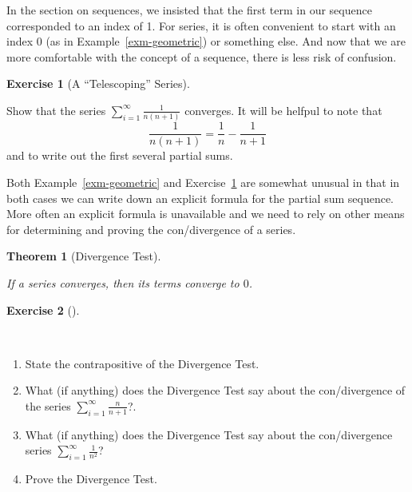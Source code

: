 \documentclass[
  letterpaper,
  DIV=11,
  numbers=noendperiod]{scrreprt}
\providecommand{\tightlist}{%
  \setlength{\itemsep}{0pt}\setlength{\parskip}{0pt}}
\theoremstyle{plain}
\newtheorem{theorem}{Theorem}[chapter]
\theoremstyle{definition}
\newtheorem{exercise}{Exercise}[chapter]
\theoremstyle{plain}
\theoremstyle{plain}
\theoremstyle{definition}
\theoremstyle{definition}
\theoremstyle{remark}
\begin{document}
\begin{tcolorbox}[enhanced jigsaw, titlerule=0mm, opacitybacktitle=0.6, leftrule=.75mm, bottomrule=.15mm, left=2mm, arc=.35mm, colback=white, rightrule=.15mm, colframe=quarto-callout-note-color-frame, toptitle=1mm, breakable, opacityback=0, colbacktitle=quarto-callout-note-color!10!white, bottomtitle=1mm, title=\textcolor{quarto-callout-note-color}{\faInfo}\hspace{0.5em}{Note}, coltitle=black, toprule=.15mm]

In the section on sequences, we insisted that the first term in our
sequence corresponded to an index of 1. For series, it is often
convenient to start with an index 0 (as in Example~\ref{exm-geometric})
or something else. And now that we are more comfortable with the concept
of a sequence, there is less risk of confusion.

\end{tcolorbox}

\begin{exercise}[A ``Telescoping''
Series]\protect\hypertarget{exr-telescoping-example}{}\label{exr-telescoping-example}

Show that the series \(\displaystyle\sum_{i=1}^\infty \frac{1}{n(n+1)}\)
converges. It will be helfpul to note that
\[\frac{1}{n(n+1)}=\frac{1}{n}-\frac{1}{n+1}\] and to write out the
first several partial sums.

\end{exercise}

Both Example~\ref{exm-geometric} and
Exercise~\ref{exr-telescoping-example} are somewhat unusual in that in
both cases we can write down an explicit formula for the partial sum
sequence. More often an explicit formula is unavailable and we need to
rely on other means for determining and proving the con/divergence of a
series.

\begin{theorem}[Divergence
Test]\protect\hypertarget{thm-divergence-test}{}\label{thm-divergence-test}

If a series converges, then its terms converge to \(0\).

\end{theorem}

\begin{exercise}[]\protect\hypertarget{exr-divergence-test-proof}{}\label{exr-divergence-test-proof}

~

\begin{enumerate}
\def\labelenumi{\arabic{enumi}.}
\tightlist
\item
  State the contrapositive of the Divergence Test.
\item
  What (if anything) does the Divergence Test say about the
  con/divergence of the series
  \(\displaystyle \sum_{i=1}^\infty \frac{n}{n+1}\)?.
\item
  What (if anything) does the Divergence Test say about the
  con/divergence series
  \(\displaystyle \sum_{i=1}^\infty \frac{1}{n^2}\)?
\item
  Prove the Divergence Test.
\end{enumerate}

\end{exercise}
\end{document}
